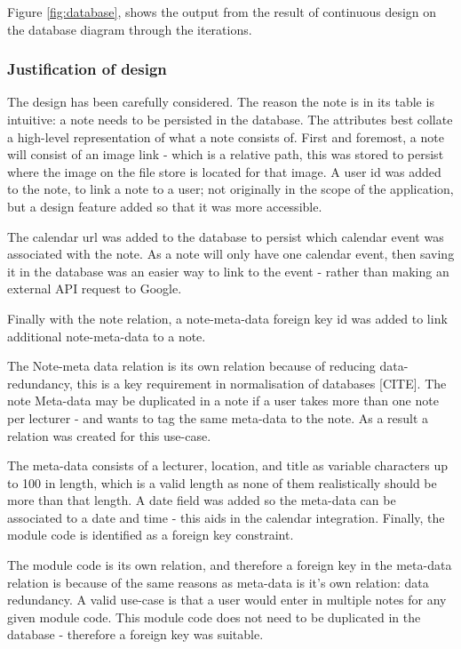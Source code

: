 Figure \ref{fig:database}, shows the output from the result of continuous design on the database diagram through the iterations.

\subsubsection{Justification of design}
The design has been carefully considered. The reason the note is in its table is intuitive: a note needs to be persisted in the database. The attributes best collate a high-level representation of what a note consists of. First and foremost,  a note will consist of an image link - which is a relative path, this was stored to persist where the image on the file store is located for that image. A user id was added to the note, to link a note to a user; not originally in the scope of the application, but a design feature added so that it was more accessible.

The calendar url was added to the database to persist which calendar event was associated with the note. As a note will only have one calendar event, then saving it in the database was an easier way to link to the event - rather than making an external API request to Google.

Finally with the note relation, a note-meta-data foreign key id was added to link additional note-meta-data to a note.

The Note-meta data relation is its own relation because of reducing data-redundancy, this is a key requirement in normalisation of databases [CITE]. The note Meta-data may be duplicated in a note if a user takes more than one note per lecturer - and wants to tag the same meta-data to the note. As a result a relation was created for this use-case.

The meta-data consists of a lecturer, location, and title as variable characters up to 100 in length, which is a valid length as none of them realistically should be more than that length. A date field was added so the meta-data can be associated to a date and time - this aids in the calendar integration. Finally, the module code is identified as a foreign key constraint.

The module code is its own relation, and therefore a foreign key in the meta-data relation is because of the same reasons as meta-data is it's own relation: data redundancy. A valid use-case is that a user would enter in multiple notes for any given module code. This module code does not need to be duplicated in the database - therefore a foreign key was suitable.

